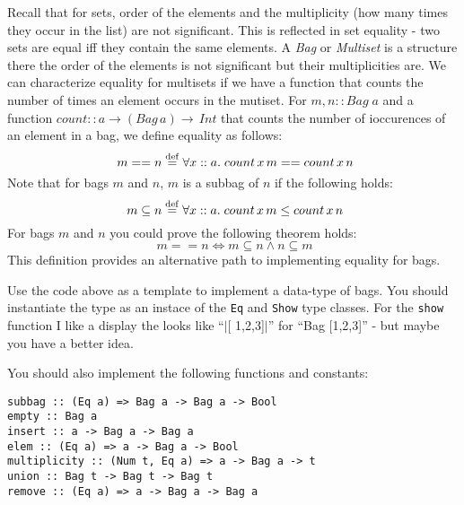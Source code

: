 \documentclass[11pt]{article}
\begin{document}
Recall that for sets, order of the elements and the multiplicity (how many
times they occur in the list) are not significant. This is reflected in set
equality - two sets are equal iff they contain the same elements.  A {\em{Bag}}
or {\em{Multiset}} is a structure there the order of the elements is not
significant but their multiplicities are.  We can characterize equality for
multisets if we have a function that counts the number of times an element
occurs in the mutiset.  For $m,n::Bag \; a$ and a function $count :: a
\rightarrow (Bag\,a) \rightarrow \,Int$ that counts the number of ioccurences
of an element in a bag, we define equality as follows:
\[\  m == n \;{\stackrel{\rm def}{=}}\; \forall {}x::a .\; count \,x\, m == count\, x\, n\]
Note that for bags $m$ and $n$, $m$ is a subbag of $n$ if the following holds:
\[\  m \subseteq n \;{\stackrel{\rm def}{=}}\; \forall {}x::a .\; count \,x\, m \le count\, x\, n\]
For bags $m$ and $n$ you could prove the following theorem holds:
\[\ m == n \Leftrightarrow m \subseteq n \wedge n\subseteq m\] This definition
provides an alternative path to implementing equality for bags.
\begin{exercise}
Use the code above as a template to implement a data-type of bags. You should
instantiate the type as an instace of the {\tt{Eq}} and {\tt{Show}} type
classes.  For the {\tt{show}} function I like a display the looks like ``$\mid$[
1,2,3]$\mid$'' for ``Bag [1,2,3]'' - but maybe you have a better idea.

You should also implement the following functions and constants:
\begin{verbatim}
subbag :: (Eq a) => Bag a -> Bag a -> Bool
empty :: Bag a
insert :: a -> Bag a -> Bag a
elem :: (Eq a) => a -> Bag a -> Bool
multiplicity :: (Num t, Eq a) => a -> Bag a -> t
union :: Bag t -> Bag t -> Bag t
remove :: (Eq a) => a -> Bag a -> Bag a
\end{verbatim}
\end{exercise}
\end{document}
